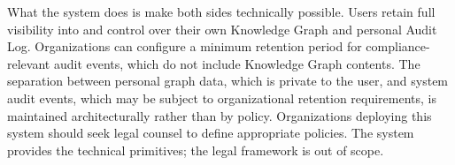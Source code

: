 What the system does is make both sides technically possible. Users retain
full visibility into and control over their own Knowledge Graph and personal
Audit Log. Organizations can configure a minimum retention period for
compliance-relevant audit events, which do not include Knowledge Graph
contents. The separation between personal graph data, which is private to
the user, and system audit events, which may be subject to organizational
retention requirements, is maintained architecturally rather than by policy.
Organizations deploying this system should seek legal counsel to define
appropriate policies. The system provides the technical primitives; the
legal framework is out of scope.
